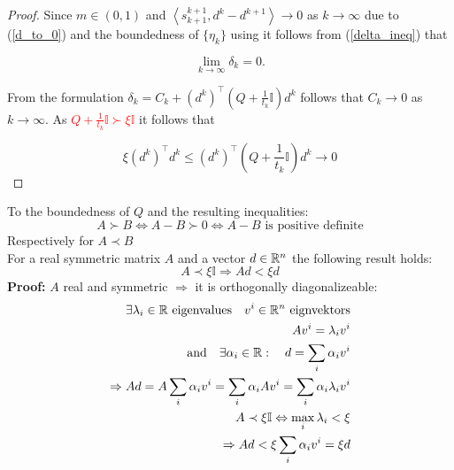 \begin{proof}
Since \(m \in (0,1)\) and \(\left\langle s^{k+1}_{k+1},d^k-d^{k+1}\right\rangle \to 0\) as \(k \to \infty\) due to (\ref{d_to_0}) and the boundedness of \(\{\eta_k\}\) using \cite[Lemma 3, p.45]{Polyak1987} it follows from  (\ref{delta_ineq}) that 

\begin{equation}
	\lim_{k \to \infty} \delta_k = 0.
\end{equation}

From the formulation \(\delta_k = C_k + \left(d^k\right)^{\top}\left(Q+\frac{1}{t_k}\mathbb{I}\right)d^k\) follows that \(C_k \to 0\) as \(k \to \infty\). As \textcolor{red}{\(Q+\frac{1}{t_k}\mathbb{I} \succ \xi\mathbb{I}\)} it follows that 

\begin{equation}
	\xi \left(d^k\right)^{\top}d^k \leq \left(d^k\right)^{\top}\left(Q+\frac{1}{t_k}\mathbb{I}\right)d^k \to 0
\end{equation}

\end{proof}

\begin{remark}
	To the boundedness of \(Q\) and the resulting inequalities:
	\[ A \succ B \Leftrightarrow A - B \succ 0\Leftrightarrow A-B \text{ is positive definite}\]
	Respectively for \(A \prec B\) \\
  For a real symmetric matrix \(A\) and a vector \(d\in \mathbb{R}^n\) the following result holds: 
	\[ A \prec \xi \mathbb{I} \Rightarrow Ad < \xi d \]
	\textbf{Proof:} \(A\) real and symmetric \(\Rightarrow\) it is orthogonally diagonalizeable:
	\begin{equation}
	\begin{split}
		\exists \lambda_i \in \mathbb{R} \text{ eigenvalues} \quad v^i \in \mathbb{R}^n \text{ eignvektors} \\
		Av^i= \lambda_iv^i \\
		\text{and} \quad \exists \alpha_i \in \mathbb{R}: \quad d = \sum_{i} {\alpha_i v^i} \\
		\Rightarrow Ad = A \sum_i{\alpha_i v^i} = \sum_i \alpha_i Av^i = \sum_i \alpha_i \lambda_i v^i\\
		A \prec \xi \mathbb{I}  \Leftrightarrow \max_i \lambda_i < \xi \\
		\Rightarrow Ad < \xi \sum_i \alpha_i v^i = \xi d
  \end{split}
	\end{equation}
\end{remark}












